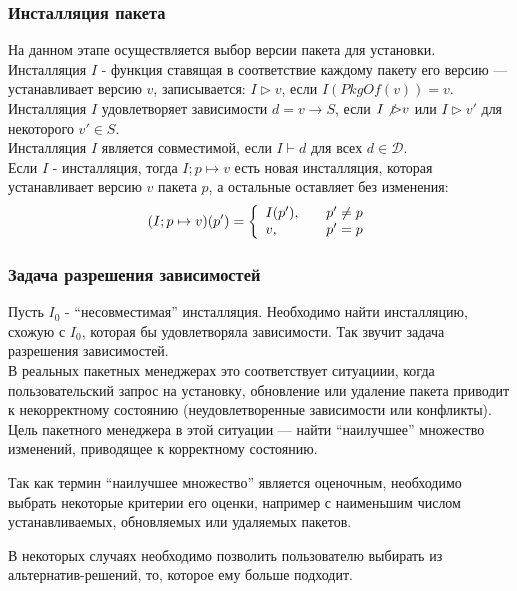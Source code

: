 \subsubsection{Инсталляция пакета}
На данном этапе осуществляется выбор версии пакета для установки. \\

Инсталляция $I$ - функция ставящая в соответствие каждому пакету его версию ---
 устанавливает версию $v$, записывается: $I \rhd v$, если $I(PkgOf(v)) = v$.\\
 
Инсталляция $I$ удовлетворяет зависимости $d = v \to S$, если $I \not\rhd v$
или $I \rhd v'$ для некоторого $v' \in S$.\\

Инсталляция $I$ является совместимой, если $I \vdash d$ для всех $d \in \mathcal{D}$.\\

Если $I$ - инсталляция, тогда $I;p \mapsto v$ есть новая инсталляция, которая устанавливает 
версию $v$ пакета $p$, а остальные оставляет без изменения:\\

$$ (I;p \mapsto v)(p') = \left\{
\begin{array}{l l}
I(p'), & \quad p' \neq p\\
v, & \quad p' = p\\
\end{array}
\right.$$

\subsubsection{Задача разрешения зависимостей}
Пусть $I_0$ - ``несовместимая'' инсталляция. Необходимо найти инсталляцию,
схожую с $I_0$, которая бы удовлетворяла зависимости. Так звучит
задача разрешения зависимостей.\\

В реальных пакетных менеджерах это соответствует ситуациии, когда пользовательский 
запрос на установку, обновление или удаление пакета приводит к некорректному состоянию
(неудовлетворенные зависимости или конфликты). Цель пакетного менеджера 
в этой ситуации --- найти ``наилучшее'' множество изменений, приводящее 
к корректному состоянию.

Так как термин ``наилучшее множество'' является оценочным, необходимо 
выбрать некоторые критерии его оценки, например с наименьшим числом
устанавливаемых, обновляемых или удаляемых пакетов.

В некоторых случаях необходимо позволить пользователю выбирать 
из альтернатив-решений, то, которое ему больше подходит.

